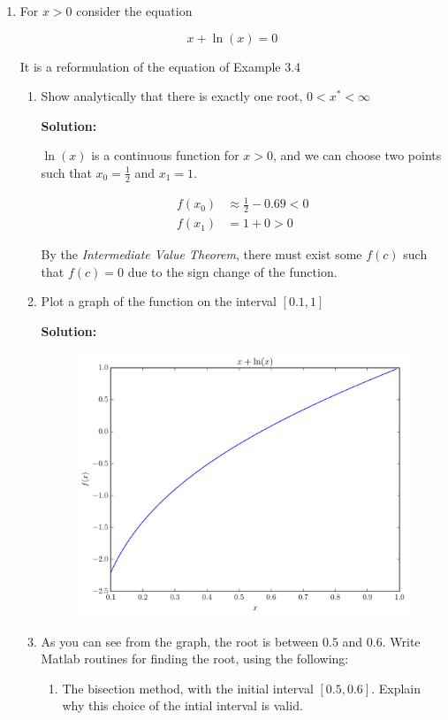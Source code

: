 \documentclass[12pt]{article}
\begin{document}
\begin{enumerate}
\begin{enumerate}
\end{enumerate}

\item For $x>0$ consider the equation

\[
x + \ln(x) = 0
\]

It is a reformulation of the equation of Example 3.4

\begin{enumerate}
  \item Show analytically that there is exactly one root, $0 < x^{*} < \infty$

  {\bf Solution:}

  $\ln(x)$ is a continuous function for $x > 0$, and we can choose two points such that
  $x_{0} = \frac{1}{2}$ and $x_{1} = 1$.

  \begin{align*}
    f\left( x_{0}\right) &\approx \frac{1}{2} - 0.69 < 0\\
    f\left( x_{1}\right) &= 1 + 0 > 0
  \end{align*}

  By the {\em Intermediate Value Theorem}, there must exist some $f(c)$ such that
  $f(c) = 0$ due to the sign change of the function.

  \item Plot a graph of the function on the interval $[0.1, 1]$

  {\bf Solution:}

  \begin{figure}
    \centering
    \includegraphics[width=.65\textwidth]{hw2_prob6a.pdf}
  \end{figure}

  \item As you can see from the graph, the root is between $0.5$ and $0.6$. Write
  {\sc Matlab} routines for finding the root, using the following:
  \begin{enumerate}
    \item The bisection method, with the initial interval $[0.5,0.6]$. Explain
    why this choice of the intial interval is valid.


\end{enumerate}
\end{enumerate}
\end{enumerate}
\end{document}
